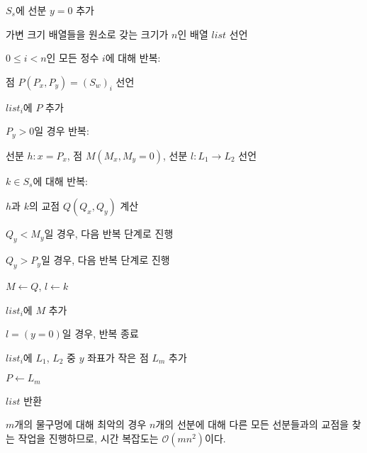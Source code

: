 \begin{algorithm}
	\item $S_s$에 선분 $y = 0$ 추가
	\item 가변 크기 배열들을 원소로 갖는 크기가 $n$인 배열 $list$ 선언
	\item $0 \leq i < n$인 모든 정수 $i$에 대해 반복:
	\begin{algorithm}
		\item 점 $P\left(P_x, P_y\right) = \left(S_w\right)_i$ 선언
		\item $list_i$에 $P$ 추가
		\item $P_y > 0$일 경우 반복:
		\begin{algorithm}
			\item 선분 $h : x = P_x$,
			점 $M\left(M_x, M_y=0\right)$,
			선분 $l : L_1 \rightarrow L_2$ 선언
			\item $k \in S_s$에 대해 반복:
			\begin{algorithm}
				\item $h$과 $k$의 교점 $Q\left(Q_x, Q_y\right)$ 계산
				\item $Q_y < M_y$일 경우, 다음 반복 단계로 진행
				\item $Q_y > P_y$일 경우, 다음 반복 단계로 진행
				\item $M \leftarrow Q$, $l \leftarrow k$
			\end{algorithm}
			\item $list_i$에 $M$ 추가
			\item $l = \left(y = 0\right)$일 경우, 반복 종료
			\item $list_i$에 $L_1$, $L_2$ 중 $y$ 좌표가 작은 점 $L_m$ 추가
			\item $P \leftarrow L_m$
		\end{algorithm} 
	\end{algorithm}
	\item $list$ 반환
\end{algorithm}

$m$개의 물구멍에 대해 최악의 경우 $n$개의 선분에 대해 다른 모든 선분들과의 교점을 찾는 작업을 진행하므로,
시간 복잡도는 $\mathcal{O}\left(mn^2\right)$이다.


